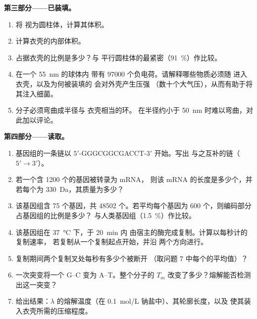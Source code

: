 \begin{problem}
\medskip
\noindent\textbf{第三部分——已装填。}
\begin{enumerate}[resume]
  \item 将  视为圆柱体，计算其体积。
  \item 计算衣壳的内部体积。
  \item {} 占据衣壳的比例是多少？与
        平行圆柱体的最紧密（\qty{91}{\%}）作比较。
  \item {} 在一个 \qty{55}{nm} 的球体内
        带有 \num{97000} 个负电荷。请解释哪些物质必须随  进入
        衣壳，以及为何被装填的  会对外壳产生压强
        （数十个大气压），从而有助于将其注入细菌。
  \item 分子必须弯曲成半径与
        衣壳相当的环。 在半径约小于
        \qty{50}{nm} 时难以弯曲，对此加以评论。
\end{enumerate}

\medskip
\noindent\textbf{第四部分——读取。}
\begin{enumerate}[resume]
  \item 基因组的一条链以 $5'$-GGGCGGCGACCT-$3'$ 开始。写出
        与之互补的链（$5' \to 3'$）。
  \item 若一个含 \num{1200} 个的基因被转录为 mRNA，
        则该 mRNA 的长度是多少个，并
        若每个为 \qty{330}{Da}，其质量为多少？
  \item 该基因组含 \qty{75}{} 个基因，共 \num{48502} 个。若平均每个基因为
        \num{600} 个，则编码部分占基因组的比例是多少？
        与人类基因组（\qty{1.5}{\%}）作比较。
  \item 该基因组在 \qty{37}{\celsius} 下，于 \qty{20}{min} 内
        由宿主的酶完成复制。计算以每秒计的复制速率，
        若复制从一个复制起点开始，并沿
        两个方向进行。
  \item 复制期间两个复制叉处每秒有多少个被断开
        （取问题
        7 中每个的平均值）？
  \item 一次突变将一个 G--C 变为 A--T。整个分子的
        $T_m$ 改变了多少？熔解能否检测出这一突变？
  \item 给出结果：$\lambda$  的熔解温度（在
        \qty{0.1}{mol/L} 钠盐中）、其轮廓长度，以及
        使其装入衣壳所需的压缩程度。
\end{enumerate}
\end{problem}
